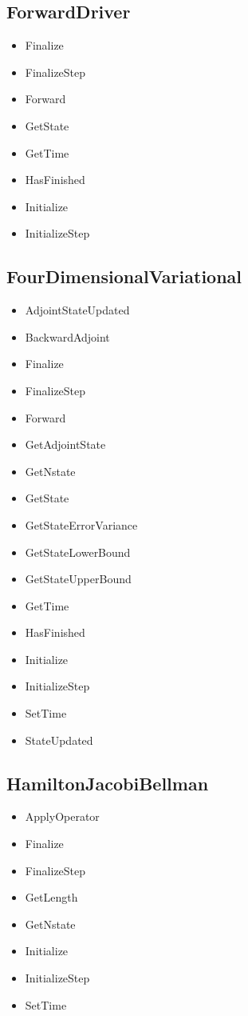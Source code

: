 \documentclass{tufte-book}
\begin{document}
\subsection{ForwardDriver}

\begin{itemize}
\item Finalize
\item FinalizeStep
\item Forward
\item GetState
\item GetTime
\item HasFinished
\item Initialize
\item InitializeStep
\end{itemize}

\subsection{FourDimensionalVariational}

\begin{itemize}
\item AdjointStateUpdated
\item BackwardAdjoint
\item Finalize
\item FinalizeStep
\item Forward
\item GetAdjointState
\item GetNstate
\item GetState
\item GetStateErrorVariance
\item GetStateLowerBound
\item GetStateUpperBound
\item GetTime
\item HasFinished
\item Initialize
\item InitializeStep
\item SetTime
\item StateUpdated
\end{itemize}

\subsection{HamiltonJacobiBellman}

\begin{itemize}
\item ApplyOperator
\item Finalize
\item FinalizeStep
\item GetLength
\item GetNstate
\item Initialize
\item InitializeStep
\item SetTime
\end{itemize}
\end{document}
